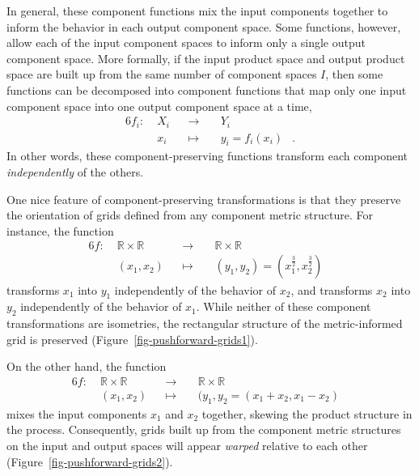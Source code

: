 \documentclass[
  letterpaper,
  DIV=11,
  numbers=noendperiod]{scrartcl}
\begin{document}
In general, these component functions mix the input components together
to inform the behavior in each output component space. Some functions,
however, allow each of the input component spaces to inform only a
single output component space. More formally, if the input product space
and output product space are built up from the same number of component
spaces \(I\), then some functions can be decomposed into component
functions that map only one input component space into one output
component space at a time, \begin{alignat*}{6}
f_{i} :\; & X_{i} & &\rightarrow& \; & Y_{i} &
\\
& x_{i} & &\mapsto& & y_{i} = f_{i}(x_{i}) &.
\end{alignat*} In other words, these component-preserving functions
transform each component \emph{independently} of the others.

One nice feature of component-preserving transformations is that they
preserve the orientation of grids defined from any component metric
structure. For instance, the function \begin{alignat*}{6}
f :\; & \mathbb{R} \times \mathbb{R} & &\rightarrow& \; & \mathbb{R} \times \mathbb{R} &
\\
& (x_{1}, x_{2}) & &\mapsto& &
(y_{1}, y_{2}) = (x_{1}^{\frac{3}{2}}, x_{2}^{\frac{3}{2}}) &
\end{alignat*} transforms \(x_{1}\) into \(y_{1}\) independently of the
behavior of \(x_{2}\), and transforms \(x_{2}\) into \(y_{2}\)
independently of the behavior of \(x_{1}\). While neither of these
component transformations are isometries, the rectangular structure of
the metric-informed grid is preserved
(Figure~\ref{fig-pushforward-grids1}).

On the other hand, the function \begin{alignat*}{6}
f :\; & \mathbb{R} \times \mathbb{R} & &\rightarrow& \; & \mathbb{R} \times \mathbb{R} &
\\
& (x_{1}, x_{2}) & &\mapsto& & (y_{1}, y_{2} = (x_{1} + x_{2}, x_{1} - x_{2}) &
\end{alignat*} mixes the input components \(x_{1}\) and \(x_{2}\)
together, skewing the product structure in the process. Consequently,
grids built up from the component metric structures on the input and
output spaces will appear \emph{warped} relative to each other
(Figure~\ref{fig-pushforward-grids2}).
\end{document}
